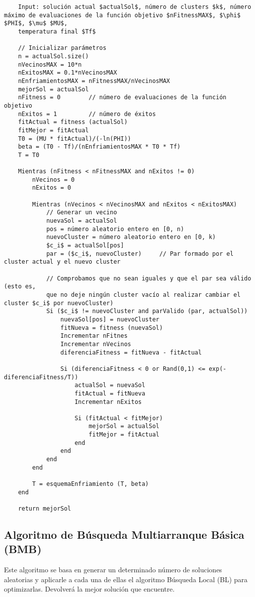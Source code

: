 	\footnotesize
	\begin{lstlisting}
	Input: solución actual $actualSol$, número de clusters $k$, número máximo de evaluaciones de la función objetivo $nFitnessMAX$, $\phi$ $PHI$, $\mu$ $MU$,
	temperatura final $Tf$

	// Inicializar parámetros
	n = actualSol.size()
	nVecinosMAX = 10*n
	nExitosMAX = 0.1*nVecinosMAX 
	nEnfriamientosMAX = nFitnessMAX/nVecinosMAX
	mejorSol = actualSol 
	nFitness = 0		// número de evaluaciones de la función objetivo 
	nExitos = 1 		// número de éxitos 
	fitActual = fitness (actualSol)
	fitMejor = fitActual 
	T0 = (MU * fitActual)/(-ln(PHI))
	beta = (T0 - Tf)/(nEnfriamientosMAX * T0 * Tf)
	T = T0
	
	Mientras (nFitness < nFitnessMAX and nExitos != 0)
		nVecinos = 0
		nExitos = 0

		Mientras (nVecinos < nVecinosMAX and nExitos < nExitosMAX)
			// Generar un vecino
			nuevaSol = actualSol 
			pos = número aleatorio entero en [0, n)
			nuevoCluster = número aleatorio entero en [0, k)
			$c_i$ = actualSol[pos]
			par = ($c_i$, nuevoCluster)		// Par formado por el cluster actual y el nuevo cluster

			// Comprobamos que no sean iguales y que el par sea válido (esto es,
			que no deje ningún cluster vacío al realizar cambiar el cluster $c_i$ por nuevoCluster)
			Si ($c_i$ != nuevoCluster and parValido (par, actualSol))
				nuevaSol[pos] = nuevoCluster
				fitNueva = fitness (nuevaSol)
				Incrementar nFitnes
				Incrementar nVecinos
				diferenciaFitness = fitNueva - fitActual 

				Si (diferenciaFitness < 0 or Rand(0,1) <= exp(-diferenciaFitness/T))
					actualSol = nuevaSol 
					fitActual = fitNueva
					Incrementar nExitos

					Si (fitActual < fitMejor)
						mejorSol = actualSol 
						fitMejor = fitActual
					end 
				end 
			end 
		end 

		T = esquemaEnfriamiento (T, beta)
	end 

	return mejorSol
	\end{lstlisting}
	\normalsize

	\subsection{Algoritmo de Búsqueda Multiarranque Básica (BMB)}
	Este algoritmo se basa en generar un determinado número de soluciones aleatorias y
	aplicarle a cada una de ellas el algoritmo Búsqueda Local (BL) para optimizarlas.
	Devolverá la mejor solución que encuentre.

